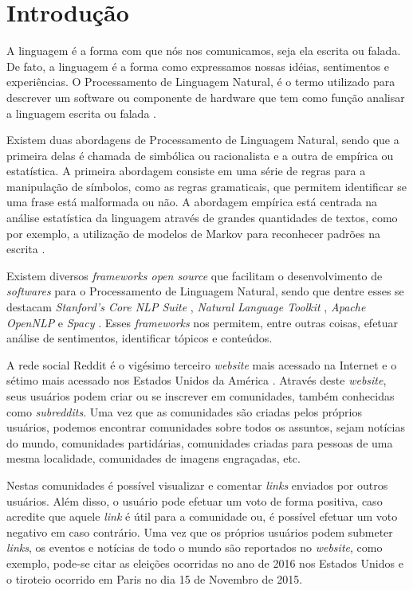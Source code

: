 \chapter{Introdução}
\label{chap:introducao}
A linguagem é a forma com que nós nos comunicamos, seja ela escrita ou
falada. De fato, a linguagem é a forma como
expressamos nossas idéias, sentimentos e experiências. O Processamento de
Linguagem Natural, é o termo utilizado para descrever um software ou componente
de hardware que tem como função analisar a linguagem escrita ou falada
\cite{jacksonmoulinier2007}.

Existem duas abordagens de Processamento de Linguagem Natural, sendo que a
primeira delas é chamada de simbólica ou racionalista e a outra de empírica ou
estatística.
A primeira abordagem consiste em uma série de regras para a manipulação de
símbolos, como as regras gramaticais, que permitem identificar se uma frase está malformada ou não. A abordagem empírica está centrada na análise estatística da linguagem através de grandes quantidades
de textos, como por exemplo, a utilização de modelos de Markov para reconhecer padrões
na escrita \cite{jacksonmoulinier2007}.

Existem diversos \textit{frameworks open source} que facilitam o desenvolvimento
de \textit{softwares} para o Processamento de Linguagem Natural, sendo que
dentre esses se destacam \textit{Stanford's Core NLP Suite} \cite{corenlp},
\textit{Natural Language Toolkit} \cite{nltk}, \textit{Apache OpenNLP} \cite{opennlp} e \textit{Spacy}
\cite{spacy}.
Esses \textit{frameworks} nos permitem, entre outras coisas, efetuar análise de
sentimentos, identificar tópicos e conteúdos.

A rede social Reddit é o vigésimo terceiro \textit{website} mais acessado na
Internet e o sétimo mais acessado nos Estados Unidos da América \cite{alexa}.
Através deste \textit{website}, seus usuários podem criar ou se inscrever em
comunidades, também conhecidas como \textit{subreddits}.
Uma vez que as comunidades são criadas pelos próprios usuários, podemos encontrar
comunidades sobre todos os assuntos, sejam notícias do mundo, comunidades
partidárias, comunidades criadas para pessoas de uma mesma localidade, comunidades
de imagens engraçadas, etc.

Nestas comunidades é possível visualizar e comentar \textit{links} enviados por
outros usuários.
Além disso, o usuário pode efetuar um voto de forma positiva, caso acredite que
aquele \textit{link} é útil para a comunidade ou, é possível
efetuar um voto negativo em caso contrário.
Uma vez que os próprios usuários podem submeter \textit{links}, os eventos e
notícias de todo o mundo são reportados no \textit{website}, como exemplo,
pode-se citar as eleições ocorridas no ano de 2016 nos Estados Unidos e o
tiroteio ocorrido em Paris no dia 15 de Novembro de 2015.

